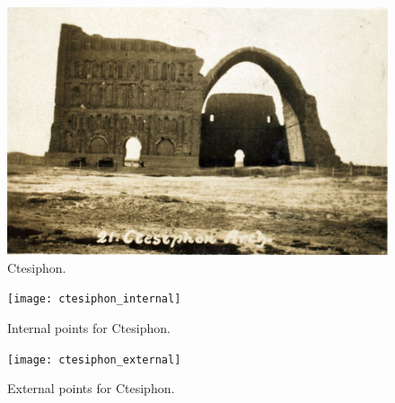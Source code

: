 \documentclass{article}
\begin{document}
\begin{figure}[htpb]
  \begin{center}
		\includegraphics[width=\textwidth]{ctesiphon}
	\end{center}
	\caption{Ctesiphon.}
	\label{fig:ctesiphon}
\end{figure}
\begin{figure}[htpb]
  \begin{center}
		\texttt{[image: ctesiphon\_internal]}
	\end{center}
	\caption{Internal points for Ctesiphon.}
	\label{fig:internal}
\end{figure}
\begin{figure}[htpb]
  \begin{center}
		\texttt{[image: ctesiphon\_external]}
	\end{center}
	\caption{External points for Ctesiphon.}
	\label{fig:external}
\end{figure}
\end{document}
